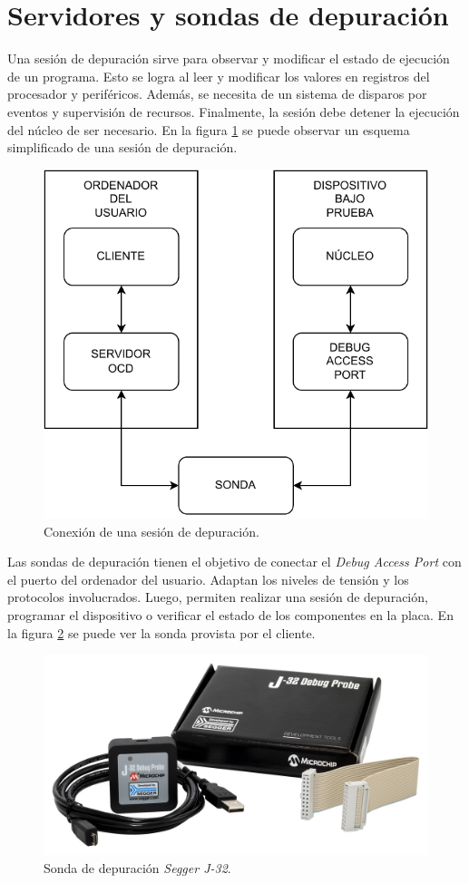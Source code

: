\section{Servidores y sondas de depuración}
\label{sec:depuracion}

Una sesión de depuración sirve para observar y modificar el estado de ejecución de un programa.
Esto se logra al leer y modificar los valores en registros del procesador y periféricos.
Además, se necesita de un sistema de disparos por eventos y supervisión de recursos.
Finalmente, la sesión debe detener la ejecución del núcleo de ser necesario.
En la figura \ref{fig:debug} se puede observar un esquema simplificado de una sesión de depuración.

\begin{figure}[htbp]
	\centering
	\includegraphics[width=.8\textwidth]{./Figures/debug.pdf}
    \caption{Conexión de una sesión de depuración.}
	\label{fig:debug}
\end{figure}

\newpage

Las sondas de depuración tienen el objetivo de conectar el \emph{Debug Access Port} con el puerto del ordenador del usuario.
Adaptan los niveles de tensión y los protocolos involucrados.
Luego, permiten realizar una sesión de depuración, programar el dispositivo o verificar el estado de los componentes en la placa.
En la figura \ref{fig:sonda} se puede ver la sonda provista por el cliente.

\begin{figure}[htbp]
	\centering
	\includegraphics[width=.8\textwidth]{./Figures/segger.jpg}
    \caption{Sonda de depuración \emph{Segger J-32}\protect\footnotemark.}
	\label{fig:sonda}
\end{figure}

